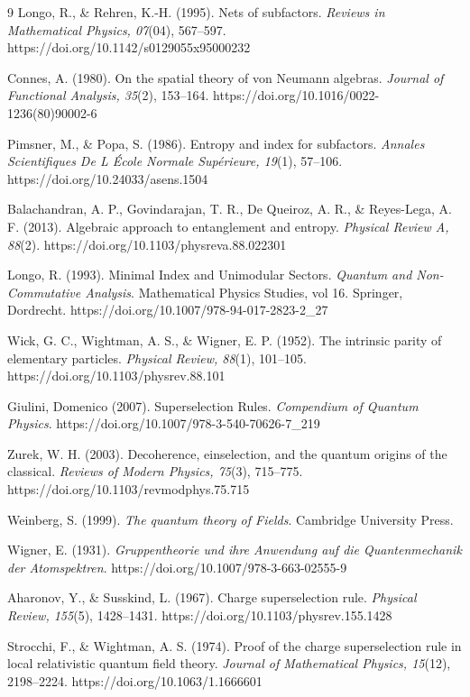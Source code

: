 \documentclass[a4paper,11pt]{article}
\begin{document}
\begin{thebibliography}{9}
Longo, R., \& Rehren, K.-H. (1995). Nets of subfactors. \emph{Reviews in Mathematical Physics, 07}(04), 567–597. https://doi.org/10.1142/s0129055x95000232

Connes, A. (1980). On the spatial theory of von Neumann algebras. \emph{Journal of Functional Analysis, 35}(2), 153–164. https://doi.org/10.1016/0022-1236(80)90002-6

Pimsner, M., \& Popa, S. (1986). Entropy and index for subfactors. \emph{Annales Scientifiques De L École Normale Supérieure, 19}(1), 57–106. https://doi.org/10.24033/asens.1504

Balachandran, A. P., Govindarajan, T. R., De Queiroz, A. R., \& Reyes-Lega, A. F. (2013). Algebraic approach to entanglement and entropy. \emph{Physical Review A, 88}(2). https://doi.org/10.1103/physreva.88.022301

Longo, R. (1993). Minimal Index and Unimodular Sectors. \emph{Quantum and Non-Commutative Analysis}. Mathematical Physics Studies, vol 16. Springer, Dordrecht. https://doi.org/10.1007/978-94-017-2823-2\_27

Wick, G. C., Wightman, A. S., \& Wigner, E. P. (1952). The intrinsic parity of elementary particles. \emph{Physical Review, 88}(1), 101–105. https://doi.org/10.1103/physrev.88.101

Giulini, Domenico (2007). Superselection Rules. \emph{Compendium of Quantum Physics}. https://doi.org/10.1007/978-3-540-70626-7\_219

Zurek, W. H. (2003). Decoherence, einselection, and the quantum origins of the classical. \emph{Reviews of Modern Physics, 75}(3), 715–775. https://doi.org/10.1103/revmodphys.75.715

Weinberg, S. (1999). \emph{The quantum theory of Fields}. Cambridge University Press.

Wigner, E. (1931). \emph{Gruppentheorie und ihre Anwendung auf die Quantenmechanik der Atomspektren}. https://doi.org/10.1007/978-3-663-02555-9

Aharonov, Y., \& Susskind, L. (1967). Charge superselection rule. \emph{Physical Review, 155}(5), 1428–1431. https://doi.org/10.1103/physrev.155.1428

Strocchi, F., \& Wightman, A. S. (1974). Proof of the charge superselection rule in local relativistic quantum field theory. \emph{Journal of Mathematical Physics, 15}(12), 2198–2224. https://doi.org/10.1063/1.1666601


\end{thebibliography}
\end{document}
